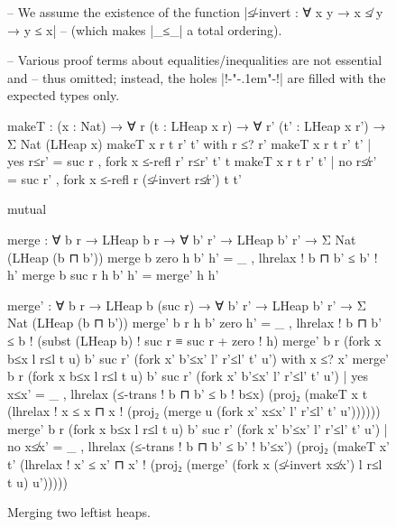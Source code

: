 \begin{figure*} 
\setlength{\mathindent}{0em}
\begin{code}
-- We assume the existence of the function |≰-invert : ∀ {x y} → x ≰ y → y ≤ x|
-- (which makes |_≤_| a total ordering).

-- Various proof terms about equalities/inequalities are not essential and
-- thus omitted; instead, the holes |{!{-"\kern-.1em"-}!}| are filled with the expected types only.

makeT : (x : Nat) → ∀ {r} (t : LHeap x r) → ∀ {r'} (t' : LHeap x r') → Σ Nat (LHeap x)
makeT x {r} t {r'} t' with r ≤? r'
makeT x {r} t {r'} t' | yes  r≤r'  =  suc r   ,  fork x ≤-refl r' r≤r' t' t
makeT x {r} t {r'} t' | no   r≰r'  =  suc r'  ,  fork x ≤-refl r (≰-invert r≰r') t t'

mutual

  merge : ∀ {b r} → LHeap b r → ∀ {b' r'} → LHeap b' r' → Σ Nat (LHeap (b ⊓ b'))
  merge {b} {zero   } h {b'} h'  =  _ , lhrelax {! b ⊓ b' ≤ b' !} h'
  merge {b} {suc r  } h {b'} h'  =  merge' h h'

  merge' : ∀ {b r} → LHeap b (suc r) → ∀ {b' r'} → LHeap b' r' → Σ Nat (LHeap (b ⊓ b'))
  merge' {b} {r} h                                  {b'}  {zero    }  h' =
    _ , lhrelax {! b ⊓ b' ≤ b !} (subst (LHeap b) {! suc r ≡ suc r + zero !} h)
  merge' {b} {r} (fork x b≤x l r≤l t u)  {b'}  {suc r'  }  (fork x' b'≤x' l' r'≤l' t' u')
    with x ≤? x'
  merge' {b} {r} (fork x b≤x l r≤l t u)  {b'}  {suc r'  }  (fork x' b'≤x' l' r'≤l' t' u')
    | yes x≤x' = _ ,  lhrelax (≤-trans {! b ⊓ b' ≤ b !} b≤x)
                        (proj₂ (makeT x t (lhrelax {! x ≤ x ⊓ x !}
                          (proj₂ (merge u (fork x' x≤x' l' r'≤l' t' u'))))))
  merge' {b} {r} (fork x b≤x l r≤l t u)  {b'} {suc r'  } (fork x' b'≤x' l' r'≤l' t' u')
    | no  x≰x' = _ ,  lhrelax (≤-trans {! b ⊓ b' ≤ b' !} b'≤x')
                        (proj₂ (makeT x' t' (lhrelax {! x' ≤ x' ⊓ x' !}
                          (proj₂ (merge' (fork x (≰-invert x≰x') l r≤l t u) u')))))
\end{code}
\caption{Merging two leftist heaps.}
\label{fig:merge}
\end{figure*}

